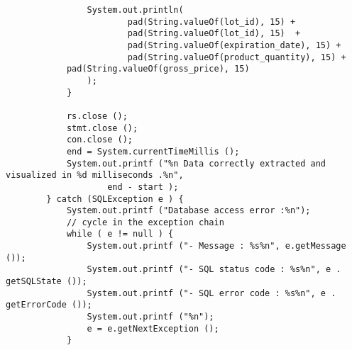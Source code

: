 \begin{lstlisting}
                System.out.println(
                        pad(String.valueOf(lot_id), 15) +
                        pad(String.valueOf(lot_id), 15)  +
                        pad(String.valueOf(expiration_date), 15) +
                        pad(String.valueOf(product_quantity), 15) +
			pad(String.valueOf(gross_price), 15)
                );
            }

            rs.close ();
            stmt.close ();
            con.close ();
            end = System.currentTimeMillis ();
            System.out.printf ("%n Data correctly extracted and visualized in %d milliseconds .%n",
                    end - start );
        } catch (SQLException e ) {
            System.out.printf ("Database access error :%n");
            // cycle in the exception chain
            while ( e != null ) {
                System.out.printf ("- Message : %s%n", e.getMessage ());
                System.out.printf ("- SQL status code : %s%n", e . getSQLState ());
                System.out.printf ("- SQL error code : %s%n", e . getErrorCode ());
                System.out.printf ("%n");
                e = e.getNextException ();
            }


\end{lstlisting}

